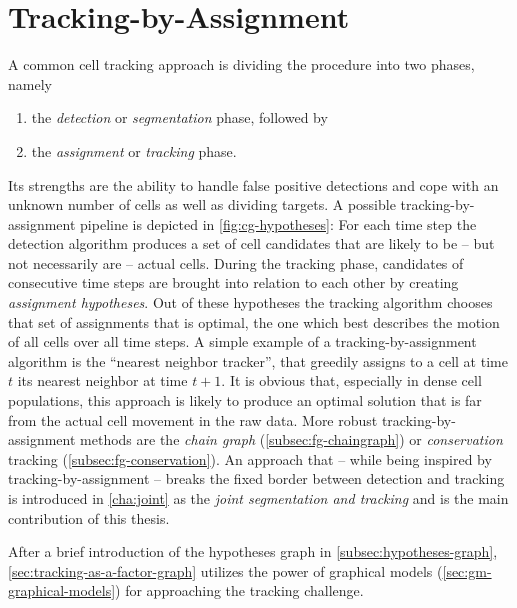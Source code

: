 \section{Tracking-by-Assignment}
\label{sec:tracking-by-assignment}

A common cell tracking approach is dividing the procedure into two phases, namely
\begin{enumerate}
      \item the \emph{detection} or \emph{segmentation} phase, followed by
      \item the \emph{assignment} or \emph{tracking} phase.
\end{enumerate}
Its strengths are the ability to handle false positive detections and cope with an unknown number of
cells as well as dividing targets.  A possible tracking-by-assignment pipeline is depicted in
\cref{fig:cg-hypotheses}: For each time step the detection algorithm produces a set of cell
candidates that are likely to be -- but not necessarily are -- actual cells. During the tracking
phase, candidates of consecutive time steps are brought into relation to each other by creating
\emph{assignment hypotheses}. Out of these hypotheses the tracking algorithm chooses that set of
assignments that is optimal, \ie the one which best describes the motion of all cells over all
time steps.
A simple example of a tracking-by-assignment algorithm is the ``nearest neighbor tracker'', that
greedily assigns to a cell at time $t$ its nearest neighbor at time $t+1$. It is obvious that,
especially in dense cell populations, this approach is likely to produce an optimal solution that is
far from the actual cell movement in the raw data. More robust tracking-by-assignment methods are
the \emph{chain graph} (\cref{subsec:fg-chaingraph}) or \emph{conservation} tracking
(\cref{subsec:fg-conservation}).  An approach that -- while being inspired by tracking-by-assignment
-- breaks the fixed border between detection and tracking is introduced in \cref{cha:joint} as the
\emph{joint segmentation and tracking} and is the main contribution of this thesis.

After a brief introduction of the hypotheses graph in \cref{subsec:hypotheses-graph},
\cref{sec:tracking-as-a-factor-graph} utilizes the power of graphical models
(\cref{sec:gm-graphical-models}) for approaching the tracking challenge.

